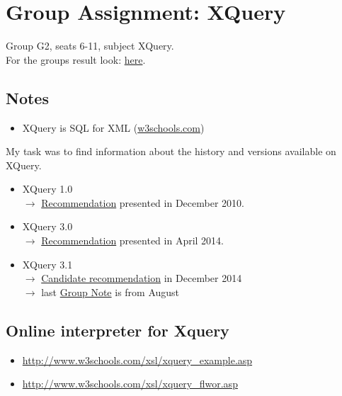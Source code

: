

%
\section{Group Assignment: XQuery}
 Group G2, seats 6-11, subject XQuery.\\
 For the groups result look: \href{https://www.os3.nl/2015-2016/students/jeroen_van_prooijen/es/week36/g2_exercise_xquery}{here}.

\subsection{Notes}
\begin{itemize}
\item XQuery is SQL for XML (\url{w3schools.com})
\end{itemize}

My task was to find information about the history and versions available on XQuery.

\begin{itemize}
\item XQuery 1.0 \hfill \\
$\rightarrow$ \href{http://www.w3.org/TR/xquery/}{Recommendation} presented in December 2010.
\item XQuery 3.0 \hfill \\
$\rightarrow$ \href{http://www.w3.org/TR/xquery-30/}{Recommendation} presented in April 2014.
\item XQuery 3.1 \hfill \\
$\rightarrow$ \href{http://www.w3.org/TR/xquery-3/}{Candidate recommendation} in December 2014 \\ 
$\rightarrow$ last \href{http://www.w3.org/TR/xquery-31-requirements/}{Group Note} is from August
\end{itemize}

\subsection{Online interpreter for Xquery}
\begin{itemize}
\item \url{http://www.w3schools.com/xsl/xquery_example.asp}
\item \url{http://www.w3schools.com/xsl/xquery_flwor.asp}
\end{itemize}

